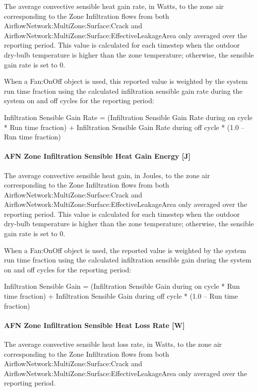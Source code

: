 The average convective sensible heat gain rate, in Watts, to the zone air corresponding to the Zone Infiltration flows from both AirflowNetwork:MultiZone:Surface:Crack and AirflowNetwork:MultiZone:Surface:EffectiveLeakageArea only averaged over the reporting period. This value is calculated for each timestep when the outdoor dry-bulb temperature is higher than the zone temperature; otherwise, the sensible gain rate is set to 0.

When a Fan:OnOff object is used, this reported value is weighted by the system run time fraction using the calculated infiltration sensible gain rate during the system on and off cycles for the reporting period:

Infiltration Sensible Gain Rate = (Infiltration Sensible Gain Rate during on cycle * Run time fraction) + Infiltration Sensible Gain Rate during off cycle * (1.0 -- Run time fraction)

\paragraph{AFN Zone Infiltration Sensible Heat Gain Energy {[}J{]}}\label{afn-zone-infiltration-sensible-heat-gain-energy-j}

The average convective sensible heat gain, in Joules, to the zone air corresponding to the Zone Infiltration flows from both AirflowNetwork:MultiZone:Surface:Crack and AirflowNetwork:MultiZone:Surface:EffectiveLeakageArea only  averaged over the reporting period. This value is calculated for each timestep when the outdoor dry-bulb temperature is higher than the zone temperature; otherwise, the sensible gain rate is set to 0.

When a Fan:OnOff object is used, the reported value is weighted by the system run time fraction using the calculated infiltration sensible gain during the system on and off cycles for the reporting period:

Infiltration Sensible Gain = (Infiltration Sensible Gain during on cycle * Run time fraction) + Infiltration Sensible Gain during off cycle * (1.0 -- Run time fraction)

\paragraph{AFN Zone Infiltration Sensible Heat Loss Rate {[}W{]}}\label{afn-zone-infiltration-sensible-heat-loss-rate-w}

The average convective sensible heat loss rate, in Watts, to the zone air corresponding to the Zone Infiltration flows from both AirflowNetwork:MultiZone:Surface:Crack and AirflowNetwork:MultiZone:Surface:EffectiveLeakageArea only averaged over the reporting period.

